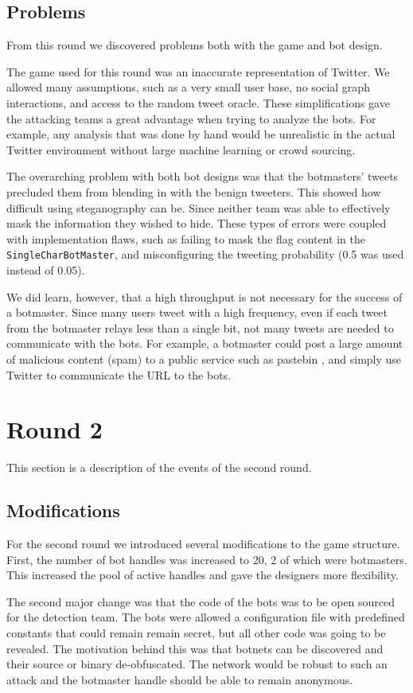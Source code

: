 \documentclass[11pt, oneside]{article} %
\numberwithin{equation}{section} %
\numberwithin{figure}{section} %
\numberwithin{table}{section} %
\renewcommand{\c}[1]{\texttt{#1}}
\begin{document}
	\subsection{Problems}
		From this round we discovered problems both with the game and bot design.

		The game used for this round was an inaccurate representation of Twitter. We allowed many assumptions, such as a very small user base, no social graph interactions, and access to the random tweet oracle. These simplifications gave the attacking teams a great advantage when trying to analyze the bots. For example, any analysis that was done by hand would be unrealistic in the actual Twitter environment without large machine learning or crowd sourcing.
		
		The overarching problem with both bot designs was that the botmasters' tweets precluded them from blending in with the benign tweeters. This showed how difficult using steganography can be. Since neither team was able to effectively mask the information they wished to hide. These types of errors were coupled with implementation flaws, such as failing to mask the flag content in the \c{SingleCharBotMaster}, and misconfiguring the tweeting probability (0.5 was used instead of 0.05).

		We did learn, however, that a high throughput is not necessary for the success of a botmaster. Since many users tweet with a high frequency, even if each tweet from the botmaster relays less than a single bit, not many tweets are needed to communicate with the bots. For example, a botmaster could post a large amount of malicious content (spam) to a public service such as pastebin \cite{pastebin}, and simply use Twitter to communicate the URL to the bots.


\section{Round 2}
	This section is a description of the events of the second round.

	\subsection{Modifications}
		For the second round we introduced several modifications to the game structure. First, the number of bot handles was increased to 20, 2 of which were botmasters. This increased the pool of active handles and gave the designers more flexibility.

		The second major change was that the code of the bots was to be open sourced for the detection team. The bots were allowed a configuration file with predefined constants that could remain remain secret, but all other code was going to be revealed. The motivation behind this was that botnets can be discovered and their source or binary de-obfuscated. The network would be robust to such an attack and the botmaster handle should be able to remain anonymous. 
\end{document}
